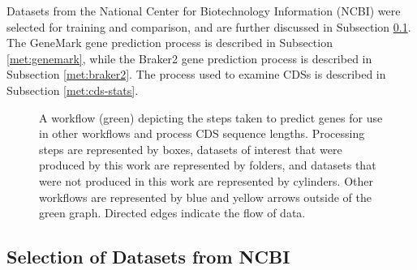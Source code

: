 Datasets from the National Center for Biotechnology Information (NCBI) were selected for training and comparison, and are further
discussed in Subsection \ref{met:datasets}. The GeneMark gene prediction
process is described in Subsection \ref{met:genemark}, while the Braker2
gene prediction process is described in Subsection \ref{met:braker2}. The
process used to examine CDSs is described in Subsection \ref{met:cds-stats}.

\begin{figure}
  \centering
  \caption[Gene prediction workflow]{A workflow (green) depicting the steps taken to predict
    genes for use in other workflows and process CDS sequence
    lengths. Processing steps are represented by boxes, datasets of
    interest that were produced by this work are represented by
    folders, and datasets that were not produced in this work are
    represented by cylinders. Other workflows are represented by blue
    and yellow arrows outside of the green graph. Directed edges
    indicate the flow of data.}
  \label{fig:predict-workflow}
\end{figure}

\subsection{Selection of Datasets from NCBI}
\label{met:datasets}

